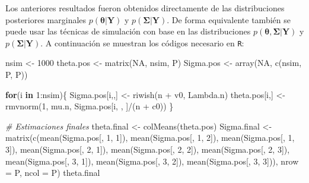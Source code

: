 \documentclass[
  10pt,
  spanish,
]{book}
\newenvironment{Shaded}{\begin{snugshade}}{\end{snugshade}}
\newcommand{\AttributeTok}[1]{\textcolor[rgb]{0.77,0.63,0.00}{#1}}
\newcommand{\CommentTok}[1]{\textcolor[rgb]{0.56,0.35,0.01}{\textit{#1}}}
\newcommand{\ConstantTok}[1]{\textcolor[rgb]{0.00,0.00,0.00}{#1}}
\newcommand{\ControlFlowTok}[1]{\textcolor[rgb]{0.13,0.29,0.53}{\textbf{#1}}}
\newcommand{\DecValTok}[1]{\textcolor[rgb]{0.00,0.00,0.81}{#1}}
\newcommand{\FunctionTok}[1]{\textcolor[rgb]{0.00,0.00,0.00}{#1}}
\newcommand{\NormalTok}[1]{#1}
\newcommand{\OtherTok}[1]{\textcolor[rgb]{0.56,0.35,0.01}{#1}}
\newcommand{\SpecialCharTok}[1]{\textcolor[rgb]{0.00,0.00,0.00}{#1}}
\theoremstyle{definition}
\theoremstyle{definition}
\theoremstyle{definition}
\theoremstyle{definition}
\theoremstyle{remark}
\begin{document}
Los anteriores resultados fueron obtenidos directamente de las distribuciones posteriores marginales \(p(\boldsymbol \theta|\mathbf{Y})\) y \(p(\boldsymbol \Sigma|\mathbf{Y})\). De forma equivalente también se puede usar las técnicas de simulación con base en las distribuciones \(p(\boldsymbol \theta,\boldsymbol \Sigma|\mathbf{Y})\) y \(p(\boldsymbol \Sigma|\mathbf{Y})\). A continuación se muestran los códigos necesario en \texttt{R}:

\begin{Shaded}
\begin{Highlighting}[]
\NormalTok{nsim }\OtherTok{\textless{}{-}} \DecValTok{1000}
\NormalTok{theta.pos }\OtherTok{\textless{}{-}} \FunctionTok{matrix}\NormalTok{(}\ConstantTok{NA}\NormalTok{, nsim, P)}
\NormalTok{Sigma.pos }\OtherTok{\textless{}{-}} \FunctionTok{array}\NormalTok{(}\ConstantTok{NA}\NormalTok{, }\FunctionTok{c}\NormalTok{(nsim, P, P))}

\ControlFlowTok{for}\NormalTok{(i }\ControlFlowTok{in} \DecValTok{1}\SpecialCharTok{:}\NormalTok{nsim)\{}
\NormalTok{  Sigma.pos[i,,] }\OtherTok{\textless{}{-}} \FunctionTok{riwish}\NormalTok{(n }\SpecialCharTok{+}\NormalTok{ v0, Lambda.n)}
\NormalTok{  theta.pos[i,] }\OtherTok{\textless{}{-}} \FunctionTok{rmvnorm}\NormalTok{(}\DecValTok{1}\NormalTok{, mu.n, }
\NormalTok{                           Sigma.pos[i, , ]}\SpecialCharTok{/}\NormalTok{(n }\SpecialCharTok{+}\NormalTok{ c0))}
\NormalTok{\}}

\CommentTok{\# Estimaciones finales}
\NormalTok{theta.final }\OtherTok{\textless{}{-}} \FunctionTok{colMeans}\NormalTok{(theta.pos)}
\NormalTok{Sigma.final }\OtherTok{\textless{}{-}} \FunctionTok{matrix}\NormalTok{(}\FunctionTok{c}\NormalTok{(}\FunctionTok{mean}\NormalTok{(Sigma.pos[, }\DecValTok{1}\NormalTok{, }\DecValTok{1}\NormalTok{]),}
                        \FunctionTok{mean}\NormalTok{(Sigma.pos[, }\DecValTok{1}\NormalTok{, }\DecValTok{2}\NormalTok{]),}
                        \FunctionTok{mean}\NormalTok{(Sigma.pos[, }\DecValTok{1}\NormalTok{, }\DecValTok{3}\NormalTok{]),}
                        \FunctionTok{mean}\NormalTok{(Sigma.pos[, }\DecValTok{2}\NormalTok{, }\DecValTok{1}\NormalTok{]),}
                        \FunctionTok{mean}\NormalTok{(Sigma.pos[, }\DecValTok{2}\NormalTok{, }\DecValTok{2}\NormalTok{]),}
                        \FunctionTok{mean}\NormalTok{(Sigma.pos[, }\DecValTok{2}\NormalTok{, }\DecValTok{3}\NormalTok{]),}
                        \FunctionTok{mean}\NormalTok{(Sigma.pos[, }\DecValTok{3}\NormalTok{, }\DecValTok{1}\NormalTok{]),}
                        \FunctionTok{mean}\NormalTok{(Sigma.pos[, }\DecValTok{3}\NormalTok{, }\DecValTok{2}\NormalTok{]), }
                        \FunctionTok{mean}\NormalTok{(Sigma.pos[, }\DecValTok{3}\NormalTok{, }\DecValTok{3}\NormalTok{])), }
                      \AttributeTok{nrow =}\NormalTok{ P, }\AttributeTok{ncol =}\NormalTok{ P)}
\NormalTok{theta.final}
\end{Highlighting}
\end{Shaded}
\end{document}
